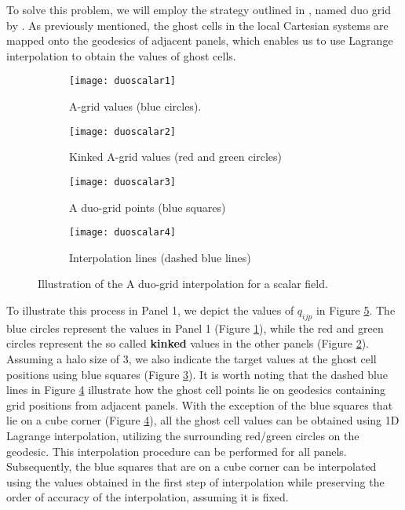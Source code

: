 To solve this problem, we will employ the strategy outlined in \citet{zerroukat:2022}, 
named duo grid by \citet{chen:2021}.
As previously mentioned, the ghost cells in the local Cartesian systems are mapped onto the geodesics 
of adjacent panels, which enables us to use Lagrange interpolation to obtain the values of ghost cells.
\begin{figure}[!htb]
	\centering
	\begin{subfigure}{0.45\textwidth}
		\texttt{[image: duoscalar1]}
		\caption{A-grid values (blue circles).\label{cs-duoscalar-1}}
	\end{subfigure}
	\begin{subfigure}{0.45\textwidth}
		\centering
		\texttt{[image: duoscalar2]}
		\caption{Kinked A-grid values (red and green circles)\label{cs-duoscalar-2}}
	\end{subfigure}

	\begin{subfigure}{0.45\textwidth}
		\centering
		\texttt{[image: duoscalar3]}
		\caption{A duo-grid points (blue squares)\label{cs-duoscalar-3}}
	\end{subfigure}
	\begin{subfigure}{0.45\textwidth}
	\centering
	\texttt{[image: duoscalar4]}
	\caption{Interpolation lines (dashed blue lines)\label{cs-duoscalar-4}}
    \end{subfigure}
 	\caption{Illustration of the A duo-grid interpolation for a scalar field. \label{cs-duoscalar}}
\end{figure}

To illustrate this process in Panel 1, we depict the values of $q_{ijp}$ in Figure \ref{cs-duoscalar}. 
The blue circles represent the values in Panel 1 (Figure \ref{cs-duoscalar-1}), while the red and green circles 
represent the so called \textbf{kinked} values in the other panels (Figure \ref{cs-duoscalar-2}). 
Assuming a halo size of 3, we also indicate the target values at the ghost cell 
positions using blue squares (Figure \ref{cs-duoscalar-3}). 
It is worth noting that the dashed blue lines in Figure \ref{cs-duoscalar-4} 
illustrate how the ghost cell points lie on geodesics containing grid positions from adjacent panels.
With the exception of the blue  squares that lie on a cube corner (Figure \ref{cs-duoscalar-4}),
all the ghost cell values can be obtained using 1D Lagrange interpolation, 
utilizing the surrounding red/green circles on the geodesic. 
This interpolation procedure can be performed for all panels. 
Subsequently, the blue squares that are on a cube corner can be interpolated using the values obtained in the first step of interpolation 
while preserving the order of accuracy of the interpolation, assuming it is fixed.

